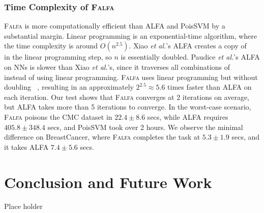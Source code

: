 \documentclass[runningheads]{llncs}
\newcommand{\falfa}{\textsc{Falfa}\xspace}
\DeclareMathOperator*{\ytr}{\mathcal{Y}_\text{train}}
\begin{document}
\subsubsection{Time Complexity of \falfa}

\falfa is more computationally efficient than ALFA and PoisSVM by a substantial margin.
Linear programming is an exponential-time algorithm, where the time complexity is around $O(n^{2.5})$.
Xiao {\em et al.}'s ALFA creates a copy of $\ytr$ in the linear programming step, so $n$ is essentially doubled.
Paudice {\em et al.}'s ALFA on NNs is slower than Xiao {\em et al.}'s, since it traverses all combinations of $\ytr$ instead of using linear programming.
\falfa uses linear programming but without doubling $\ytr$, resulting in an approximately $2^{2.5}\approx5.6$ times faster than ALFA on each iteration.
Our test shows that \falfa converges at 2 iterations on average, but ALFA takes more than 5 iterations to converge.
In the worst-case scenario, \falfa poisons the CMC dataset in $22.4\pm8.6$ secs, while ALFA requires $405.8\pm348.4$ secs, and PoisSVM took over 2 hours.
We observe the minimal difference on BreastCancer, where \falfa completes the task at $5.3\pm1.9$ secs, and it takes ALFA $7.4\pm5.6$ secs.


\section{Conclusion and Future Work}
\label{sec:conclusion}

Place holder

%
%
%


%
\end{document}
